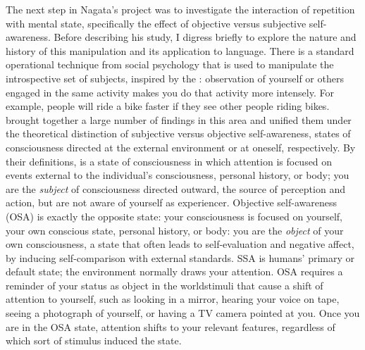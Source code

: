The next step in Nagata's project was to investigate the interaction of repetition with mental state, specifically the effect of objective versus subjective self-awareness. Before describing his study, I digress briefly to explore the nature and history of this manipulation and its application to language. There is a standard operational technique from social psychology that is used to manipulate the introspective set of subjects, inspired by the : observation of yourself or others engaged in the same activity makes you do that activity more intensely. For example, people will ride a bike faster  if they see other people riding bikes. \citet{DuvalEtAl1972} brought together a large number of findings in this area and unified them under the theoretical distinction of subjective versus objective self-awareness, states of consciousness directed at the external environment or at oneself, respectively. By their definitions,  is a state of consciousness in which attention is focused on events external to the individual's consciousness, personal history, or body; you are the \textit{subject} of consciousness directed outward, the source of perception and action, but are not aware of yourself as experiencer. Objective self-awareness (OSA) is exactly the opposite state: your consciousness is focused on yourself, your own conscious state, personal history, or body: you are the \textit{object} of your own consciousness, a state that often leads to self-evaluation and negative affect, by inducing self-comparison with external standards. SSA is humans' primary or default state; the environment normally draws your attention. OSA requires a reminder of your status as object in the world\schdash{}stimuli that cause a shift of attention to yourself, such as looking in a mirror, hearing your voice on tape, seeing a photograph of yourself, or having a TV camera pointed at you. Once you are in the OSA state, attention shifts to your relevant features, regardless of which sort of stimulus induced the state.

